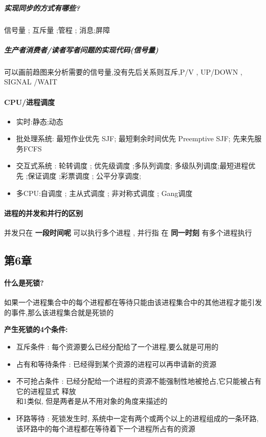 \documentclass[UTF8,a4paper]{ctexart}
\begin{document}
\subparagraph{实现同步的方式有哪些?}信号量 ; 互斥量 ;管程 ; 消息;屏障

\subparagraph{生产者消费者/读者写者问题的实现代码(信号量)}
可以画前趋图来分析需要的信号量,没有先后关系则互斥,P/V , UP/DOWN , SIGNAL /WAIT

\paragraph{CPU/进程调度}
\begin{itemize}
	\item 实时:静态;动态	    
	\item 批处理系统: 最短作业优先 SJF; 最短剩余时间优先 Preemptive SJF; 先来先服务FCFS
	\item 交互式系统 : 轮转调度 ; 优先级调度 ;多队列调度; 多级队列调度;最短进程优先 ;保证调度 ;彩票调度 ; 公平分享调度;
	\item 多CPU:自调度 ; 主从式调度 ; 非对称式调度 ; Gang调度
\end{itemize}

\paragraph{进程的并发和并行的区别} 并发只在 \textbf{一段时间呢} 可以执行多个进程 , 并行指 在 \textbf{同一时刻} 有多个进程执行

\subsection{第6章}
\paragraph{什么是死锁?}如果一个进程集合中的每个进程都在等待只能由该进程集合中的其他进程才能引发的事件,那么该进程集合就是死锁的

\textbf{产生死锁的4个条件:}
\begin{itemize}
	\item 互斥条件 : 每个资源要么已经分配给了一个进程,要么就是可用的
	\item 占有和等待条件 : 已经得到某个资源的进程可以再申请新的资源
	\item 不可抢占条件 : 已经分配给一个进程的资源不能强制性地被抢占,它只能被占有它的进程显式 释放\\和1类似, 但是两者是从不用对象的角度来描述的
	\item 环路等待 : 死锁发生时, 系统中一定有两个或两个以上的进程组成的一条环路,该环路中的每个进程都在等待着下一个进程所占有的资源
\end{itemize}
\end{document}
